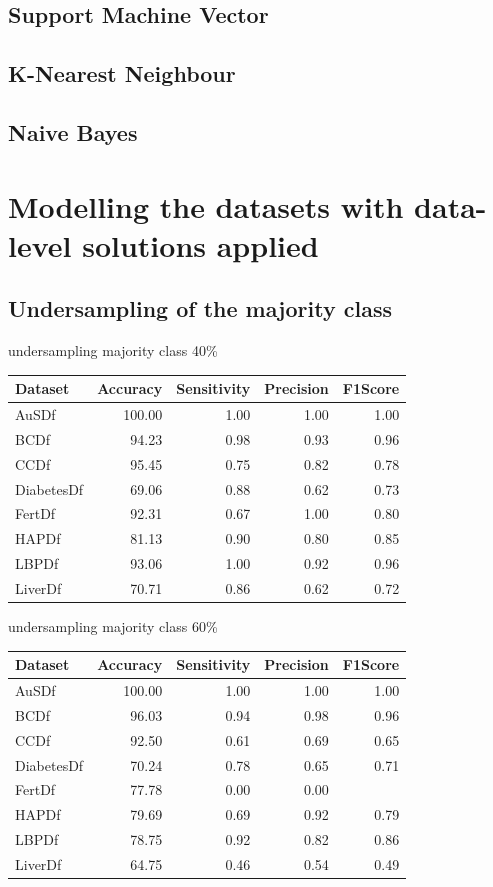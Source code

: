 \subsection{Support Machine Vector}
\subsection{K-Nearest Neighbour}
\subsection{Naive  Bayes}
\section{Modelling the datasets with data-level solutions applied}
\subsection{Undersampling of the majority class}
undersampling majority class 40\%
\begin{table}[ht]
\centering
\begin{tabular}{lrrrr}
  \hline
Dataset & Accuracy & Sensitivity & Precision & F1Score \\ 
  \hline
AuSDf & 100.00 & 1.00 & 1.00 & 1.00 \\ 
  BCDf & 94.23 & 0.98 & 0.93 & 0.96 \\ 
  CCDf & 95.45 & 0.75 & 0.82 & 0.78 \\ 
  DiabetesDf & 69.06 & 0.88 & 0.62 & 0.73 \\ 
  FertDf & 92.31 & 0.67 & 1.00 & 0.80 \\ 
  HAPDf & 81.13 & 0.90 & 0.80 & 0.85 \\ 
  LBPDf & 93.06 & 1.00 & 0.92 & 0.96 \\ 
  LiverDf & 70.71 & 0.86 & 0.62 & 0.72 \\ 
   \hline
\end{tabular}
\end{table}

undersampling majority class 60\%
\begin{table}[ht]
\centering
\begin{tabular}{lrrrr}
  \hline
Dataset & Accuracy & Sensitivity & Precision & F1Score \\ 
  \hline
AuSDf & 100.00 & 1.00 & 1.00 & 1.00 \\ 
  BCDf & 96.03 & 0.94 & 0.98 & 0.96 \\ 
  CCDf & 92.50 & 0.61 & 0.69 & 0.65 \\ 
  DiabetesDf & 70.24 & 0.78 & 0.65 & 0.71 \\ 
  FertDf & 77.78 & 0.00 & 0.00 &  \\ 
  HAPDf & 79.69 & 0.69 & 0.92 & 0.79 \\ 
  LBPDf & 78.75 & 0.92 & 0.82 & 0.86 \\ 
  LiverDf & 64.75 & 0.46 & 0.54 & 0.49 \\ 
   \hline
\end{tabular}
\end{table}

